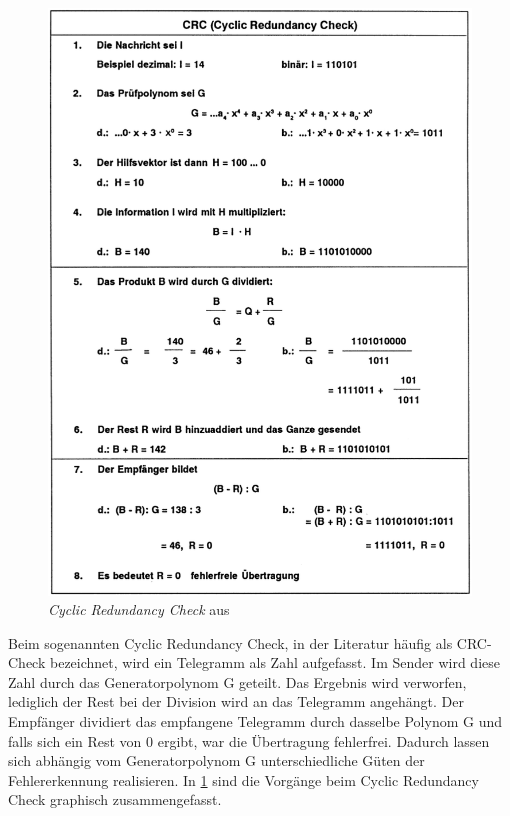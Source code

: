 \begin{figure}
\centering
\includegraphics[width=\textwidth]{abbildungen/20160314_crc}
\caption[\textit{Cyclic Redundancy Check}]{\textit{Cyclic Redundancy Check} aus \cite[S.~38]{schn06}}
\label{fig:crc}
\end{figure}

Beim sogenannten Cyclic Redundancy Check, in der Literatur häufig als CRC-Check bezeichnet, wird ein Telegramm als Zahl aufgefasst. Im Sender wird diese Zahl durch das Generatorpolynom G geteilt. Das Ergebnis wird verworfen, lediglich der Rest bei der Division wird an das Telegramm angehängt. Der Empfänger dividiert das empfangene Telegramm durch dasselbe Polynom G und falls sich ein Rest von 0 ergibt, war die Übertragung fehlerfrei. Dadurch lassen sich abhängig vom Generatorpolynom G unterschiedliche Güten der Fehlererkennung realisieren. In \ref{fig:crc} sind die Vorgänge beim Cyclic Redundancy Check graphisch zusammengefasst.



